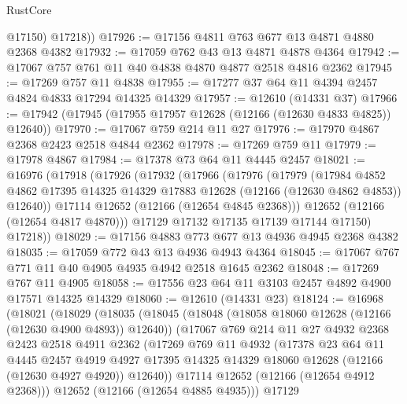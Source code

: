 \begin{lexlean}{RustCore}
\begin{coremodule}
          @17150)
        @17218))
@17926 := @17156 @4811 @763 @677 @13 @4871 @4880 @2368 @4382
@17932 := @17059 @762 @43 @13 @4871 @4878 @4364
@17942 := @17067 @757 @761 @11 @40 @4838 @4870 @4877 @2518 @4816 @2362
@17945 := @17269 @757 @11 @4838
@17955 := @17277 @37 @64 @11 @4394 @2457 @4824 @4833 @17294 @14325 @14329
@17957 := @12610 (@14331 @37)
@17966 := @17942 (@17945 (@17955 @17957 @12628 (@12166 (@12630 @4833 @4825)) @12640))
@17970 := @17067 @759 @214 @11 @27
@17976 := @17970 @4867 @2368 @2423 @2518 @4844 @2362
@17978 := @17269 @759 @11
@17979 := @17978 @4867
@17984 := @17378 @73 @64 @11 @4445 @2457
@18021 := @16976
    (@17918
      (@17926
        (@17932
          (@17966
            (@17976
              (@17979
                (@17984
                  @4852
                  @4862
                  @17395
                  @14325
                  @14329
                  @17883
                  @12628
                  (@12166 (@12630 @4862 @4853))
                  @12640))
              @17114
              @12652
              (@12166 (@12654 @4845 @2368)))
            @12652
            (@12166 (@12654 @4817 @4870)))
          @17129
          @17132
          @17135
          @17139
          @17144
          @17150)
        @17218))
@18029 := @17156 @4883 @773 @677 @13 @4936 @4945 @2368 @4382
@18035 := @17059 @772 @43 @13 @4936 @4943 @4364
@18045 := @17067 @767 @771 @11 @40 @4905 @4935 @4942 @2518 @1645 @2362
@18048 := @17269 @767 @11 @4905
@18058 := @17556 @23 @64 @11 @3103 @2457 @4892 @4900 @17571 @14325 @14329
@18060 := @12610 (@14331 @23)
@18124 := @16968
    (@18021
      (@18029
        (@18035
          (@18045
            (@18048 (@18058 @18060 @12628 (@12166 (@12630 @4900 @4893)) @12640))
            (@17067
              @769
              @214
              @11
              @27
              @4932
              @2368
              @2423
              @2518
              @4911
              @2362
              (@17269
                @769
                @11
                @4932
                (@17378
                  @23
                  @64
                  @11
                  @4445
                  @2457
                  @4919
                  @4927
                  @17395
                  @14325
                  @14329
                  @18060
                  @12628
                  (@12166 (@12630 @4927 @4920))
                  @12640))
              @17114
              @12652
              (@12166 (@12654 @4912 @2368)))
            @12652
            (@12166 (@12654 @4885 @4935)))
          @17129

\end{coremodule}
\end{lexlean}

